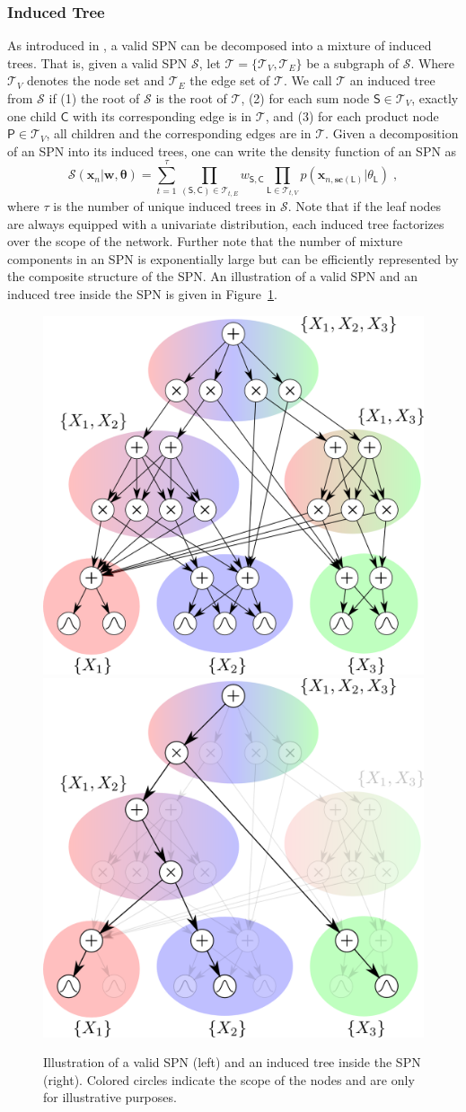 \documentclass[10pt,letterpaper]{article}
\newcommand{\SPT}{\mathcal{T}}
\newcommand{\SPN}{\mathcal{S}}
\newcommand{\x}{\mathbf{x}}
\newcommand{\xn}{\mathbf{x}_{n}}
\newcommand{\ProductNode}{\mathsf{P}}
\newcommand{\SumNode}{\mathsf{S}}
\newcommand{\Leaf}{\mathsf{L}}
\newcommand{\Child}{\mathsf{C}}
\newcommand{\scope}{\ensuremath{\mathbf{sc}}} %
\newcommand{\w}{w}
\theoremstyle{mystyle}
\begin{document}
\subsubsection{Induced Tree}
As introduced in \cite{Zhao2016}, a valid SPN can be decomposed into a mixture of induced trees.
That is, given a valid SPN $\SPN$, let $\SPT = \{ \SPT_V, \SPT_E \}$ be a subgraph of $\SPN$. 
Where $\SPT_V$ denotes the node set and $\SPT_E$ the edge set of $\SPT$. 
We call $\SPT$ an induced tree from $\SPN$ if (1) the root of $\SPN$ is the root of $\SPT$, (2) for each sum node $\SumNode \in \SPT_V$, exactly one child $\Child$ with its corresponding edge is in $\SPT$, and (3) for each product node $\ProductNode \in \SPT_V$, all children and the corresponding edges are in $\SPT$.
Given a decomposition of an SPN into its induced trees, one can write the density function of an SPN as
\begin{equation} \label{eq:InducedTree}
  \SPN(\xn | \bm w, \bm \theta) = \sum_{t=1}^{\tau} \prod_{(\SumNode,\Child) \in \SPT_{t,E}} \w_{\SumNode,\Child} \prod_{\Leaf \in \SPT_{t,V}} p(\x_{n,\scope(\Leaf)}| \theta_{\Leaf}) \; ,
\end{equation}
where $\tau$ is the number of unique induced trees in $\SPN$.
Note that if the leaf nodes are always equipped with a univariate distribution, each induced tree factorizes over the scope of the network.
Further note that the number of mixture components in an SPN is exponentially large but can be efficiently represented by the composite structure of the SPN.
An illustration of a valid SPN and an induced tree inside the SPN is given in Figure~\ref{fig:inducedTree}.
\begin{figure}%
    \centering
    \includegraphics[width=0.4\linewidth]{spn}%
    \hfill
    \includegraphics[width=0.4\linewidth]{inducedTree}
    \caption{Illustration of a valid SPN (left) and an induced tree inside the SPN (right). Colored circles indicate the scope of the nodes and are only for illustrative purposes.}%
    \label{fig:inducedTree}%
\end{figure}
\end{document}
